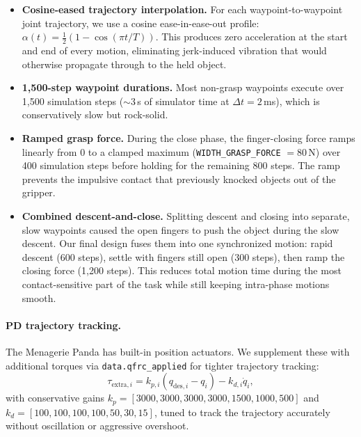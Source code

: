 \documentclass[11pt]{article}
\begin{document}
\begin{itemize}[nosep, leftmargin=*]
\item \textbf{Cosine-eased trajectory interpolation.} For each
waypoint-to-waypoint joint trajectory, we use a cosine ease-in-ease-out
profile: $\alpha(t) = \frac{1}{2}(1 - \cos(\pi t / T))$. This produces
zero acceleration at the start and end of every motion, eliminating
jerk-induced vibration that would otherwise propagate through to the
held object.
\item \textbf{1{,}500-step waypoint durations.} Most non-grasp waypoints
execute over 1{,}500 simulation steps ($\sim$3\,s of simulator time at
$\Delta t = 2$\,ms), which is conservatively slow but rock-solid.
\item \textbf{Ramped grasp force.} During the close phase, the
finger-closing force ramps linearly from $0$ to a clamped maximum
(\texttt{WIDTH\_GRASP\_FORCE} $= 80$\,N) over 400 simulation steps
before holding for the remaining 800 steps. The ramp prevents the
impulsive contact that previously knocked objects out of the gripper.
\item \textbf{Combined descent-and-close.} Splitting descent and closing
into separate, slow waypoints caused the open fingers to push the object
during the slow descent. Our final design fuses them into one
synchronized motion: rapid descent (600 steps), settle with fingers
still open (300 steps), then ramp the closing force (1{,}200 steps).
This reduces total motion time during the most contact-sensitive part
of the task while still keeping intra-phase motions smooth.
\end{itemize}

\paragraph{PD trajectory tracking.}
The Menagerie Panda has built-in position actuators. We supplement
these with additional torques via \texttt{data.qfrc\_applied} for tighter
trajectory tracking:
\[
\tau_{\text{extra},i} = k_{p,i}(q_{\text{des},i} - q_i)
- k_{d,i} \dot{q}_i,
\]
with conservative gains $k_p = [3000, 3000, 3000, 3000, 1500, 1000, 500]$
and $k_d = [100, 100, 100, 100, 50, 30, 15]$, tuned to track the
trajectory accurately without oscillation or aggressive overshoot.
\end{document}
